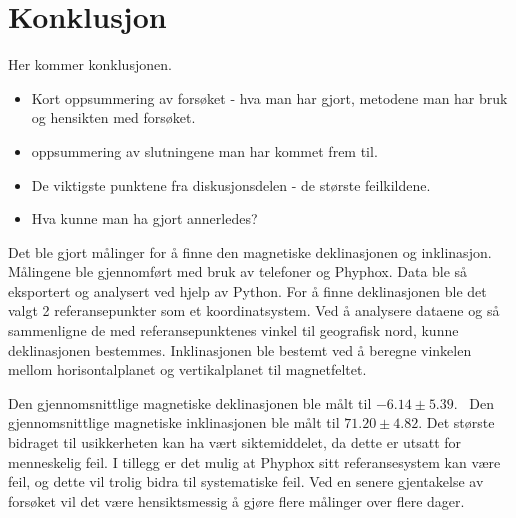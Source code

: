 \section{Konklusjon}
Her kommer konklusjonen.

\begin{itemize}
    \item Kort oppsummering av forsøket - hva man har gjort, metodene man har bruk og hensikten med forsøket. 
    \item oppsummering av slutningene man har kommet frem til.
    \item De viktigste punktene fra diskusjonsdelen - de største feilkildene. 
    \item Hva kunne man ha gjort annerledes?
\end{itemize}

Det ble gjort målinger for å finne den magnetiske deklinasjonen og inklinasjon. Målingene ble gjennomført med bruk av telefoner og Phyphox. Data ble så eksportert og analysert ved hjelp av Python. For å finne deklinasjonen ble det valgt 2 referansepunkter som et koordinatsystem. Ved å analysere dataene og så sammenligne de med referansepunktenes vinkel til geografisk nord, kunne deklinasjonen bestemmes. Inklinasjonen ble bestemt ved å beregne vinkelen mellom horisontalplanet og vertikalplanet til magnetfeltet. 

Den gjennomsnittlige magnetiske deklinasjonen ble målt til $-6.14 \pm 5.39$\textdegree. \ Den gjennomsnittlige magnetiske inklinasjonen ble målt til $71.20 \pm 4.82$\textdegree. Det største bidraget til usikkerheten kan ha vært siktemiddelet, da dette er utsatt for menneskelig feil. I tillegg er det mulig at Phyphox sitt referansesystem kan være feil, og dette vil trolig bidra til systematiske feil. Ved en senere gjentakelse av forsøket vil det være hensiktsmessig å gjøre flere målinger over flere dager.     
